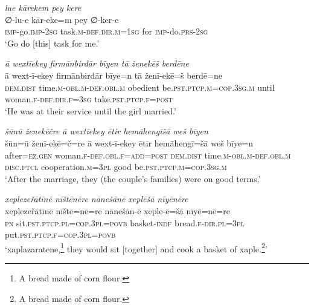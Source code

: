 \ea \label{RE.20}
\textit{lue kārekem pey kere} \\ 
\gll ∅-lu-e kār-eke=m pey ∅-ker-e \\ 
 \textsc{imp-}go.\textsc{imp-}\textsc{2sg} task\textsc{.m}\textsc{-def}\textsc{.dir}\textsc{.m}\textsc{=\textsc{1sg}} for \textsc{imp-}do\textsc{.prs}-\textsc{2sg} \\ 
\glt `Go do [this] task for me.'
\z 
 
\ea \label{RE.21}
\textit{ā wextīekey firmānbirđār bīyen tā ženekēš berdēne} \\ 
\gll ā wext-ī-ekey firmānbirđār bīye=n tā ženī-ekē=š berdē=ne \\ 
 \textsc{dem.dist} time\textsc{.m}\textsc{-obl}\textsc{.m}\textsc{-def}\textsc{.obl}\textsc{.m} obedient be\textsc{.pst}\textsc{.ptcp}\textsc{.m}\textsc{=cop}\textsc{.3sg}\textsc{.m} until woman\textsc{.f}\textsc{-def}\textsc{.dir}\textsc{.f}\textsc{=3sg} take\textsc{.pst}\textsc{.ptcp}\textsc{.f}\textsc{=\textsc{post}} \\ 
\glt `He was at their service until the girl married.'
\z 
 
\ea \label{RE.22}
\textit{šūnū ženekēčre ā wextīekey ētir hemāhengīšā weš bīyen} \\ 
\gll šūn=ū ženī-ekē=č=re ā wext-ī-ekey ētir hemāhengī=šā weš bīye=n \\ 
 after\textsc{=ez.gen} woman\textsc{.f}\textsc{-def}\textsc{.obl}\textsc{.f}\textsc{=add}\textsc{=\textsc{post}} \textsc{dem.dist} time\textsc{.m}\textsc{-obl}\textsc{.m}\textsc{-def}\textsc{.obl}\textsc{.m} \textsc{disc.ptcl} cooperation\textsc{.m}\textsc{=3pl} good be\textsc{.pst}\textsc{.ptcp}\textsc{.m}\textsc{=cop}\textsc{.3sg}\textsc{.m} \\ 
\glt `After the marriage, they (the couple's families) were on good terms.'
\z 
 
\ea \label{RE.24}
\textit{xeplezeřātīnē nīštēnēre nānešānē xeplēšā nīyēnēre} \\ 
\gll xeplezeřātīnē nīštē=nē=re nānešān-ē xeple-ē=šā nīyē=nē=re \\ 
 \textsc{pn} sit\textsc{.pst}\textsc{.ptcp}\textsc{.pl}\textsc{=cop}\textsc{.3pl}\textsc{=\textsc{povb}} basket\textsc{-indf} bread\textsc{.f}\textsc{-dir}\textsc{.pl}\textsc{=3pl} put\textsc{.pst}\textsc{.ptcp}\textsc{.f}\textsc{=cop}\textsc{.3pl}\textsc{=\textsc{povb}} \\ 
\glt `xaplazaratene,\footnote{A bread made of corn flour.} they would sit [together] and cook a basket of xaple.\footnote{A bread made of corn flour.}'
\z 
 

